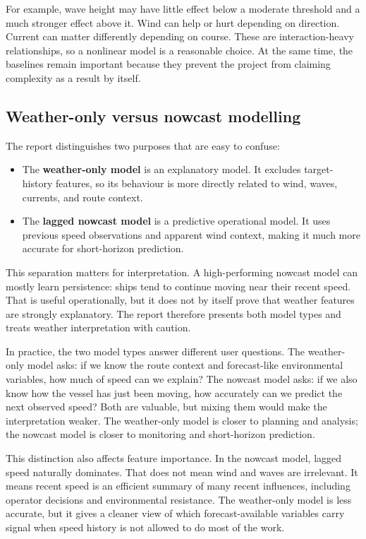 \documentclass[10pt,a4paper]{article}
\begin{document}
For example, wave height may have little effect below a moderate threshold and a
much stronger effect above it. Wind can help or hurt depending on direction.
Current can matter differently depending on course. These are interaction-heavy
relationships, so a nonlinear model is a reasonable choice. At the same time,
the baselines remain important because they prevent the project from claiming
complexity as a result by itself.

\subsection{Weather-only versus nowcast modelling}

The report distinguishes two purposes that are easy to confuse:

\begin{itemize}
    \item The \textbf{weather-only model} is an explanatory model. It excludes
    target-history features, so its behaviour is more directly related to
    wind, waves, currents, and route context.
    \item The \textbf{lagged nowcast model} is a predictive operational model.
    It uses previous speed observations and apparent wind context, making it
    much more accurate for short-horizon prediction.
\end{itemize}

This separation matters for interpretation. A high-performing nowcast model can
mostly learn persistence: ships tend to continue moving near their recent speed.
That is useful operationally, but it does not by itself prove that weather
features are strongly explanatory. The report therefore presents both model
types and treats weather interpretation with caution.

In practice, the two model types answer different user questions. The
weather-only model asks: if we know the route context and forecast-like
environmental variables, how much of speed can we explain? The nowcast model
asks: if we also know how the vessel has just been moving, how accurately can we
predict the next observed speed? Both are valuable, but mixing them would make
the interpretation weaker. The weather-only model is closer to planning and
analysis; the nowcast model is closer to monitoring and short-horizon
prediction.

This distinction also affects feature importance. In the nowcast model, lagged
speed naturally dominates. That does not mean wind and waves are irrelevant. It
means recent speed is an efficient summary of many recent influences, including
operator decisions and environmental resistance. The weather-only model is less
accurate, but it gives a cleaner view of which forecast-available variables
carry signal when speed history is not allowed to do most of the work.
\end{document}
